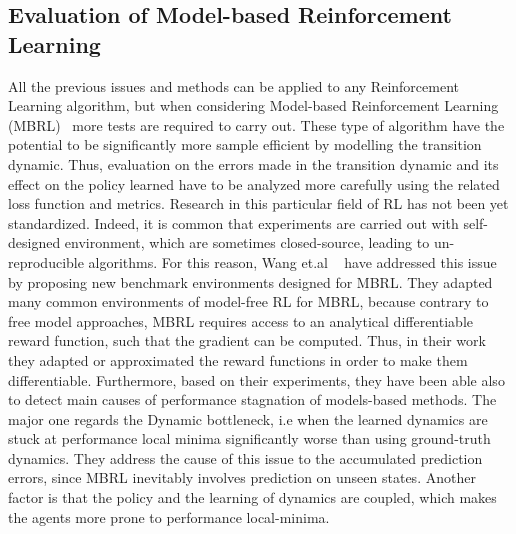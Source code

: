 \documentclass{article}
\begin{document}
\subsection{Evaluation of Model-based Reinforcement Learning}
All the previous issues and methods can be applied to any Reinforcement Learning algorithm, but when considering Model-based Reinforcement Learning (MBRL)~\cite{MBRL1} more tests are required to carry out. These type of algorithm have the potential to be significantly more sample efficient by modelling the transition dynamic. Thus, evaluation on the errors made in the transition dynamic and its effect on the policy learned have to be analyzed more carefully using the related loss function and metrics.
Research in this particular field of RL has not been yet standardized. Indeed, it is common that experiments are carried out with self-designed environment, which are sometimes closed-source, leading to un-reproducible algorithms. For this reason,  Wang et.al ~\cite{MBRLBenchmarking} have addressed this issue by proposing new benchmark environments designed for MBRL. They adapted many common environments of model-free RL for MBRL, because contrary to free model approaches, MBRL requires access to an analytical differentiable reward function, such that the gradient can be computed. Thus, in their work they adapted or approximated the reward functions in order to make them differentiable. Furthermore, based on their experiments, they have been able also to detect main causes of performance stagnation of models-based methods. The major one regards the Dynamic bottleneck, i.e when the learned dynamics are stuck at performance local minima significantly worse than using ground-truth dynamics. They address the cause of this issue to the accumulated prediction errors, since MBRL inevitably involves prediction on unseen states. Another factor is that the policy and the learning of dynamics are coupled, which makes the agents more prone to performance local-minima.
\end{document}
